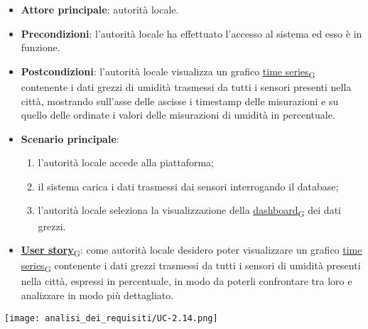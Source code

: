 \newpage
{}
\begin{itemize}
	\item \textbf{Attore principale}: autorità locale.
	\item \textbf{Precondizioni}: l'autorità locale ha effettuato l'accesso al sistema ed esso è in funzione.
	\item \textbf{Postcondizioni}: l'autorità locale visualizza un grafico \href{https://7last.github.io/docs/pb/documentazione-interna/glossario\#time-series}{time series\textsubscript{G}} contenente i dati grezzi di umidità trasmessi da tutti i sensori presenti nella città, mostrando sull'asse delle ascisse i timestamp delle misurazioni e su quello delle ordinate i valori delle misurazioni di umidità in percentuale.
	\item \textbf{Scenario principale}:
	      \begin{enumerate}
		      \item l'autorità locale accede alla piattaforma;
		      \item il sistema carica i dati trasmessi dai sensori interrogando il database;
		      \item l'autorità locale seleziona la visualizzazione della \href{https://7last.github.io/docs/pb/documentazione-interna/glossario\#dashboard}{dashboard\textsubscript{G}} dei dati grezzi.
	      \end{enumerate}
	\item \href{https://7last.github.io/docs/pb/documentazione-interna/glossario\#user-story}{\textbf{User story}\textsubscript{G}}:
	      come autorità locale desidero poter visualizzare un grafico \href{https://7last.github.io/docs/pb/documentazione-interna/glossario\#time-series}{time series\textsubscript{G}} contenente i dati grezzi trasmessi da tutti i sensori
	      di umidità presenti nella città, espressi in percentuale, in modo da poterli confrontare tra loro e analizzare in modo più dettagliato.
\end{itemize}
\begin{center}
	\texttt{[image: analisi\_dei\_requisiti/UC-2.14.png]}
\end{center}

